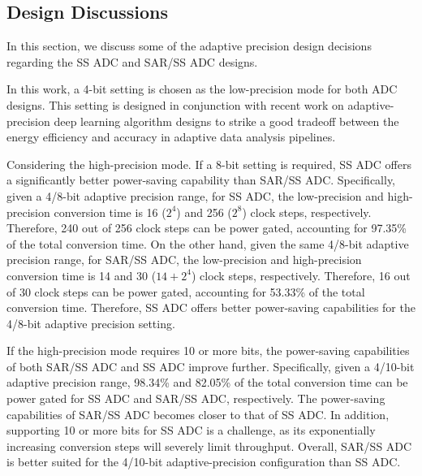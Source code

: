 \subsection{Design Discussions}\label{discussion}

In this section, we discuss some of the adaptive precision design decisions regarding the SS ADC and SAR/SS ADC designs. 


In this work, a 4-bit setting is chosen as the low-precision mode for both ADC designs. This 
setting is designed in conjunction with recent work on adaptive-precision deep learning algorithm 
designs to strike a good tradeoff between the energy efficiency and accuracy in adaptive data analysis 
pipelines. 


Considering the high-precision mode. If a 8-bit setting is required, SS ADC offers a significantly better power-saving
capability than SAR/SS ADC. Specifically, given a 4/8-bit adaptive precision range, for SS ADC, the 
low-precision and high-precision conversion time is 16 ($2^4$) and 256 ($2^8$) clock steps, respectively. Therefore, 
240 out of 256 clock steps can be power gated, accounting for 97.35\% of the total conversion time.  
On the other hand, given the same 4/8-bit adaptive precision range, for SAR/SS ADC, the low-precision and 
high-precision conversion time is 14 and 30 ($14+2^4$) clock steps, respectively. Therefore, 16 out of 30 clock steps 
can be power gated, accounting for 53.33\% of the total conversion time. Therefore, SS ADC offers better power-saving
capabilities for the 4/8-bit adaptive precision setting. 

If the high-precision mode requires 10 or more bits, the power-saving capabilities of both SAR/SS 
ADC and SS ADC improve further. Specifically, given a 4/10-bit adaptive precision range, 98.34\% and 82.05\% of the 
total conversion time can be power gated for SS ADC and SAR/SS ADC, respectively. The power-saving capabilities of 
SAR/SS ADC becomes closer to that of SS ADC. In addition, supporting 10 or more bits for SS ADC is a challenge, as 
its exponentially increasing conversion steps will severely limit throughput. 
Overall, SAR/SS ADC is better suited for the 4/10-bit adaptive-precision configuration than SS ADC.


